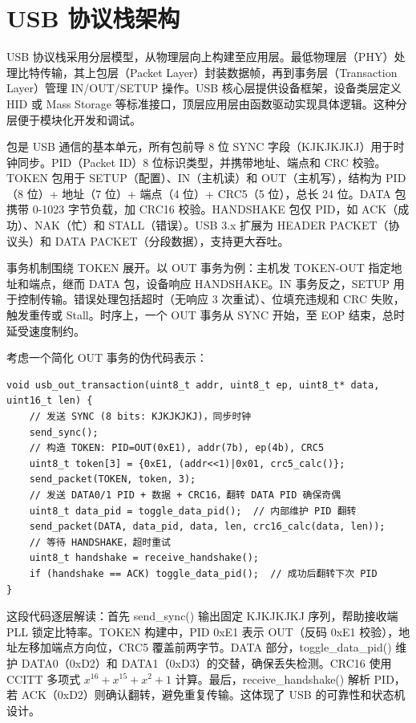 \chapter{USB 协议栈架构}
USB 协议栈采用分层模型，从物理层向上构建至应用层。最低物理层（PHY）处理比特传输，其上包层（Packet Layer）封装数据帧，再到事务层（Transaction Layer）管理 IN/OUT/SETUP 操作。USB 核心层提供设备框架，设备类层定义 HID 或 Mass Storage 等标准接口，顶层应用层由函数驱动实现具体逻辑。这种分层便于模块化开发和调试。\par
包是 USB 通信的基本单元，所有包前导 8 位 SYNC 字段（KJKJKJKJ）用于时钟同步。PID（Packet ID）8 位标识类型，并携带地址、端点和 CRC 校验。TOKEN 包用于 SETUP（配置）、IN（主机读）和 OUT（主机写），结构为 PID（8 位）+ 地址（7 位）+ 端点（4 位）+ CRC5（5 位），总长 24 位。DATA 包携带 0-1023 字节负载，加 CRC16 校验。HANDSHAKE 包仅 PID，如 ACK（成功）、NAK（忙）和 STALL（错误）。USB 3.x 扩展为 HEADER PACKET（协议头）和 DATA PACKET（分段数据），支持更大吞吐。\par
事务机制围绕 TOKEN 展开。以 OUT 事务为例：主机发 TOKEN-OUT 指定地址和端点，继而 DATA 包，设备响应 HANDSHAKE。IN 事务反之，SETUP 用于控制传输。错误处理包括超时（无响应 3 次重试）、位填充违规和 CRC 失败，触发重传或 Stall。时序上，一个 OUT 事务从 SYNC 开始，至 EOP 结束，总时延受速度制约。\par
考虑一个简化 OUT 事务的伪代码表示：\par
\begin{lstlisting}
void usb_out_transaction(uint8_t addr, uint8_t ep, uint8_t* data, uint16_t len) {
    // 发送 SYNC (8 bits: KJKJKJKJ)，同步时钟
    send_sync();
    // 构造 TOKEN: PID=OUT(0xE1), addr(7b), ep(4b), CRC5
    uint8_t token[3] = {0xE1, (addr<<1)|0x01, crc5_calc()};
    send_packet(TOKEN, token, 3);
    // 发送 DATA0/1 PID + 数据 + CRC16，翻转 DATA PID 确保奇偶
    uint8_t data_pid = toggle_data_pid();  // 内部维护 PID 翻转
    send_packet(DATA, data_pid, data, len, crc16_calc(data, len));
    // 等待 HANDSHAKE，超时重试
    uint8_t handshake = receive_handshake();
    if (handshake == ACK) toggle_data_pid();  // 成功后翻转下次 PID
}
\end{lstlisting}
这段代码逐层解读：首先 send\_{}sync() 输出固定 KJKJKJKJ 序列，帮助接收端 PLL 锁定比特率。TOKEN 构建中，PID 0xE1 表示 OUT（反码 0xE1 校验），地址左移加端点方向位，CRC5 覆盖前两字节。DATA 部分，toggle\_{}data\_{}pid() 维护 DATA0（0xD2）和 DATA1（0xD3）的交替，确保丢失检测。CRC16 使用 CCITT 多项式 $x^{16} + x^{15} + x^{2} + 1$ 计算。最后，receive\_{}handshake() 解析 PID，若 ACK（0xD2）则确认翻转，避免重复传输。这体现了 USB 的可靠性和状态机设计。\par
